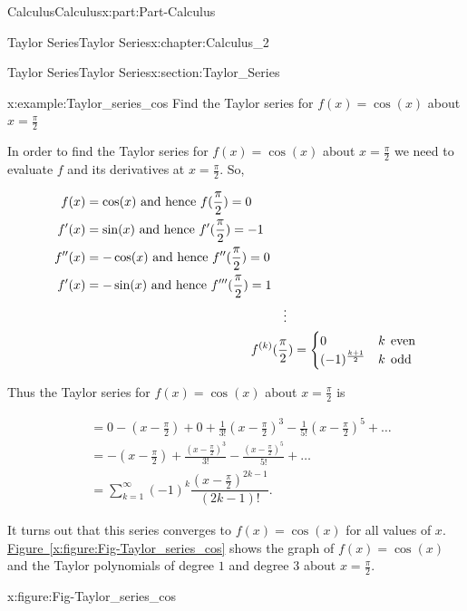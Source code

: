 \documentclass[oneside,10pt,]{book}
\newcommand{\xreffont}{\relax}
\numberwithin{equation}{section}
\newcommand{\amp}{&}
\begin{document}
\begin{partptx}{Calculus}{}{Calculus}{}{}{x:part:Part-Calculus}
\begin{chapterptx}{Taylor Series}{}{Taylor Series}{}{}{x:chapter:Calculus_2}
\begin{sectionptx}{Taylor Series}{}{Taylor Series}{}{}{x:section:Taylor_Series}
\begin{enumerate}
\end{enumerate}
%
\begin{example}{}{x:example:Taylor_series_cos}%
Find the Taylor series for   \(f(x)=\cos(x) \) about \(x=\frac{\pi}{2} \)%
\par\smallskip%
\noindent\hypertarget{g:solution:id543698}{}In order to find the Taylor series for   \(f(x)=\cos(x) \) about \(x=\frac{\pi}{2} \)   we need to evaluate \(f \) and its derivatives at  \(x=\frac{\pi}{2}. \)  So,%
\par
%
\begin{align*}
f(x) \amp =\cos(x)  \,\, \text{and hence}\,\,   f(\frac{\pi}{2})=0  \\
f'(x) \amp =\sin(x)  \,\, \text{and hence}\,\,   f'(\frac{\pi}{2})=-1 \\
f''(x) \amp =-\cos(x)  \,\, \text{and hence}\,\,   f''(\frac{\pi}{2})=0  \\
f'(x) \amp =-\sin(x)  \,\, \text{and hence}\,\,   f'''(\frac{\pi}{2})=1 \\
\amp \hspace{5.5cm}  \vdots \\
\amp \hspace{4.6cm}  f^{(k)}(\frac{\pi}{2})=\begin{cases} 0 \amp k\;\, \text{even} \\
(-1)^{\frac{k+1}{2}} \amp  k \;\, \text{odd} \end{cases} 
\end{align*}
%
\par
Thus the Taylor series for  \(f(x)=\cos(x) \) about \(x=\frac{\pi}{2} \)  is%
\par
%
\begin{align*}
\amp = 0-(x-\frac{\pi}{2})+0+\frac{1}{3!}(x-\frac{\pi}{2})^{3}-\frac{1}{5!}(x-\frac{\pi}{2})^{5}+\dots\\
\amp =-(x-\frac{\pi}{2})+\frac{(x-\frac{\pi}{2})^{3}}{3!}-\frac{(x-\frac{\pi}{2})^{5}}{5!}+\dots\\
\amp = \sum_{k=1}^{\infty}(-1)^{k}\dfrac{(x-\frac{\pi}{2})^{2k-1}}{(2k-1)!}.
\end{align*}
%
\par
It turns out that this series converges to  \(f(x)=\cos(x) \) for all values of \(x. \)  \hyperref[x:figure:Fig-Taylor_series_cos]{Figure~{\xreffont\ref{x:figure:Fig-Taylor_series_cos}}} shows the graph of \(f(x)=\cos(x) \) and the Taylor polynomials of degree \(1 \)  and degree \(3    \) about \(x=\frac{\pi}{2} .\)%
\begin{figureptx}{}{x:figure:Fig-Taylor_series_cos}{}%

\end{figureptx}
\end{example}
\end{sectionptx}
\end{chapterptx}
\end{partptx}
\end{document}
